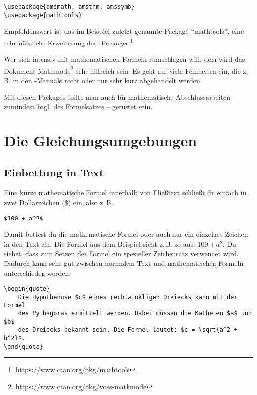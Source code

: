 \begin{lstlisting}
\usepackage{amsmath, amsthm, amssymb}
\usepackage{mathtools}
\end{lstlisting}

Empfehlenswert ist das im Beispiel zuletzt genannte Package \enquote{mathtools}, eine sehr nützliche Erweiterung der \AmSmath-Packages.\footnote{\href{https://www.ctan.org/pkg/mathtools}{https://www.ctan.org/pkg/mathtools}}

Wer sich intensiv mit mathematischen Formeln rumschlagen will, dem wird das Dokument Mathmode\footnote{\href{https://www.ctan.org/pkg/voss-mathmode}{https://www.ctan.org/pkg/voss-mathmode}} sehr hilfreich sein. Es geht auf viele Feinheiten ein, die z.\,B. in den \AmSmath-Manuals nicht oder nur sehr kurz abgehandelt werden.

Mit diesen Packages sollte man auch für mathematische Abschlussarbeiten -- zumindest bzgl. des Formelsatzes -- gerüstet sein.

\section{Die Gleichungsumgebungen}
\subsection{Einbettung in Text}

Eine kurze mathematische Formel innerhalb von Fließtext schließt du einfach in zwei Dollarzeichen (\$) ein, also z.\,B.

\begin{lstlisting}
$100 + a^2$
\end{lstlisting}

Damit bettest du die mathematische Formel oder auch nur ein einzelnes Zeichen in den Text ein. Die Formel aus dem Beispiel sieht z.\,B. so aus: $100 + a^2$. Du siehst, dass zum Setzen der Formel ein spezieller Zeichensatz verwendet wird. Dadurch kann sehr gut zwischen normalem Text und mathematischen Formeln unterschieden werden.

\begin{lstlisting}
\begin{quote}
	Die Hypothenuse $c$ eines rechtwinkligen Dreiecks kann mit der Formel 
	des Pythagoras ermittelt werden. Dabei müssen die Katheten $a$ und $b$
	des Dreiecks bekannt sein. Die Formel lautet: $c = \sqrt{a^2 + b^2}$. 
\end{quote}
\end{lstlisting}

